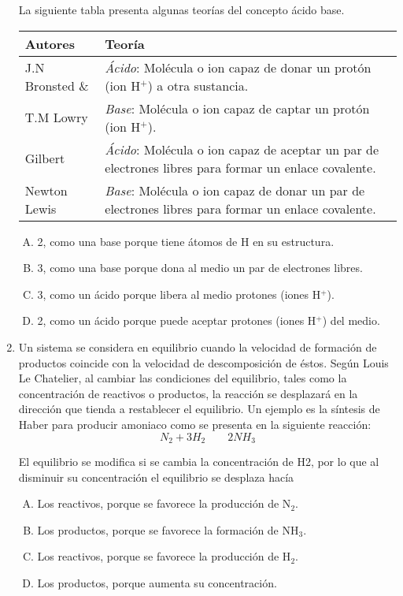 \begin{enumerate}
La siguiente tabla presenta algunas teorías del concepto ácido base.
\begin{tabular}{|p{.95in}p{2.2in}|}
\hline 
Autores & Teoría\\
\hline 
J.N Bronsted \& & \textit{Ácido}: Molécula o ion capaz de donar un protón (ion H$^{+}$) a otra sustancia. \\
T.M Lowry &\textit{Base}: Molécula o ion capaz de captar un protón (ion H$^{+}$). \\
\hline 
Gilbert & \textit{Ácido}: Molécula o ion capaz de aceptar un par de electrones libres para formar un enlace covalente. \\
\hline 
Newton  Lewis & \textit{Base}: Molécula o ion capaz de donar un par de electrones libres para formar un enlace covalente.\\
\hline 
\end{tabular} 


\begin{enumerate}[(A)]
\item 2, como una base porque tiene átomos de H en su estructura.
\item  3, como una base porque dona al medio un par de electrones libres.
\item  3, como un ácido porque libera al medio protones (iones H$^{+}$).
\item 2, como un ácido porque puede aceptar protones (iones H$^{+}$) del medio.
\end{enumerate}


\item Un sistema se considera en equilibrio cuando la velocidad de formación de productos coincide con la velocidad de descomposición de éstos. Según Louis Le Chatelier, al cambiar las condiciones del equilibrio, tales como la concentración de reactivos o productos, la reacción se desplazará en la dirección que tienda a restablecer el equilibrio. Un ejemplo es la síntesis de Haber para producir amoniaco como se presenta en la siguiente reacción: \label{mon-22}
\begin{equation*}
N_2 + 3H_2 \qquad  2NH_3 
\end{equation*}

El equilibrio se modifica si se cambia la concentración de 	H2, por lo que al disminuir su concentración el equilibrio se desplaza hacía

\begin{enumerate}[(A)]
\item Los reactivos, porque se favorece la producción de N$_2$.
\item  Los productos, porque se favorece la formación de NH$_3$.
\item  Los reactivos, porque se favorece la producción de H$_2$.
\item Los productos, porque aumenta su concentración.
\end{enumerate}


\end{enumerate}
